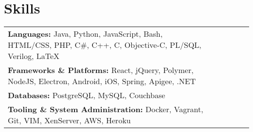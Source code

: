 \documentclass[line]{resume}
\begin{document}
\section{Skills}
\begin{tabular}{l l l l l l}
	\textbf{Languages:} Java, Python, JavaScript, Bash, HTML/CSS, PHP, C\#, C++, C, Objective-C, PL/SQL, Verilog, \LaTeX \\
	\textbf{Frameworks \& Platforms:} React, jQuery, Polymer, NodeJS, Electron, Android, iOS, Spring, Apigee, .NET \\
	\textbf{Databases:} PostgreSQL, MySQL, Couchbase \\
	\textbf{Tooling \& System Administration:} Docker, Vagrant, Git, VIM, XenServer, AWS, Heroku \\
\end{tabular}
\end{document}
